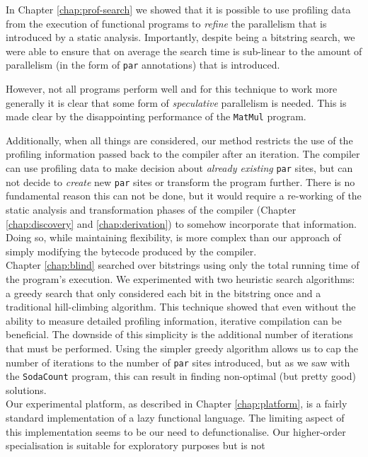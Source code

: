 In Chapter \ref{chap:prof-search} we showed that it is possible to use
profiling data from the execution of functional programs to \emph{refine} the
parallelism that is introduced by a static analysis. Importantly, despite being
a bitstring search, we were able to ensure that on average the search time is
sub-linear to the amount of parallelism (in the form of \verb|par| annotations)
that is introduced.

However, not all programs perform well and for this technique to work more
generally it is clear that some form of \emph{speculative} parallelism is
needed. This is made clear by the disappointing performance of the
\verb-MatMul- program.

Additionally, when all things are considered, our method restricts the use of
the profiling information passed back to the compiler after an iteration. The
compiler can use profiling data to make decision about \emph{already existing}
\verb|par| sites, but can not decide to \emph{create} new \verb|par| sites or
transform the program further. There is no fundamental reason this can not be
done, but it would require a re-working of the static analysis and
transformation phases of the compiler (Chapter \ref{chap:discovery} and
\ref{chap:derivation}) to somehow incorporate that information. Doing so, while
maintaining flexibility, is more complex than our approach of simply
modifying the bytecode produced by the compiler.
\\[0.35cm]
Chapter \ref{chap:blind} searched over bitstrings using only the total running
time of the program's execution. We experimented with two heuristic search
algorithms: a greedy search that only considered each bit in the bitstring once
and a traditional hill-climbing algorithm. This technique showed that even
without the ability to measure detailed profiling information, iterative
compilation can be beneficial. The downside of this simplicity is the
additional number of iterations that must be performed. Using the simpler
greedy algorithm allows us to cap the number of iterations to the number of
\verb|par| sites introduced, but as we saw with the \verb|SodaCount| program,
this can result in finding non-optimal (but pretty good) solutions.
\\[0.35cm]
Our experimental platform, as described in Chapter \ref{chap:platform}, is a
fairly standard implementation of a lazy functional language. The limiting
aspect of this implementation seems to be our need to defunctionalise. Our
higher-order specialisation is suitable for exploratory purposes but is not
